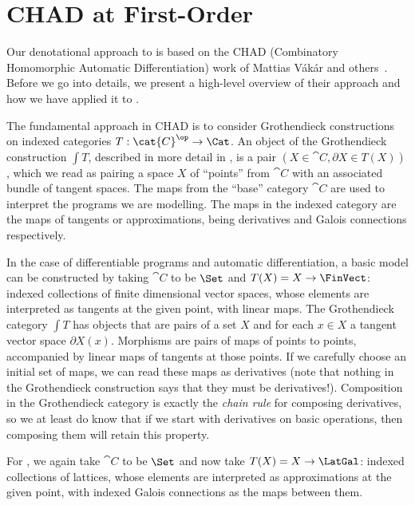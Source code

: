 \section{CHAD at First-Order}
\label{sec:first-order}

Our denotational approach to \GPS is based on the CHAD (Combinatory Homomorphic Automatic Differentiation) work of Mattias Vákár and others~\cite{vakar22,nunes2023}. Before we go into details, we present a high-level overview of their approach and how we have applied it to \GPS.

The fundamental approach in CHAD is to consider Grothendieck constructions on indexed categories $T : \cat{C}^\op \to \Cat$. An object of the Grothendieck construction $\int T$, described in more detail in , is a pair $(X \in \cat{C}, \partial X \in T(X))$, which we read as pairing a space $X$ of ``points'' from $\cat{C}$ with an associated bundle of tangent spaces. The maps from the ``base'' category $\cat{C}$ are used to interpret the programs we are modelling. The maps in the indexed category are the maps of tangents or approximations, being derivatives and Galois connections respectively.

In the case of differentiable programs and automatic differentiation, a basic model can be constructed by taking $\cat{C}$ to be $\Set$ and $T(X) = X \to \FinVect$: indexed collections of finite dimensional vector spaces, whose elements are interpreted as tangents at the given point, with linear maps. The Grothendieck category $\int T$ has objects that are pairs of a set $X$ and for each $x \in X$ a tangent vector space $\partial X(x)$. Morphisms are pairs of maps of points to points, accompanied by linear maps of tangents at those points. If we carefully choose an initial set of maps, we can read these maps as derivatives (note that nothing in the Grothendieck construction says that they must be derivatives!). Composition in the Grothendieck category is exactly the {\em chain rule} for composing derivatives, so we at least do know that if we start with derivatives on basic operations, then composing them will retain this property.

For \GPS, we again take $\cat{C}$ to be $\Set$ and now take $T(X) = X \to \LatGal$: indexed collections of lattices, whose elements are interpreted as approximations at the given point, with indexed Galois connections as the maps between them.

